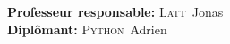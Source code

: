 \begin{titlepage}
\begin{center}
\end{center}

\begin{minipage}{8\textwidth}
\begin{flushleft} \large
\textbf{Professeur responsable:} \textsc{Latt}~Jonas\\
\textbf{Diplômant:} \textsc{Python}~Adrien
\end{flushleft}
\end{minipage}


\end{titlepage}